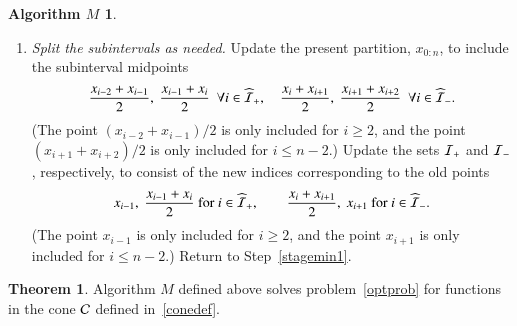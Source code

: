 \documentclass[review]{elsarticle}
\theoremstyle{definition}
\newtheorem*{algoM}{Algorithm $M$}
\newtheorem{theorem}{Theorem}
\begin{document}
\begin{algoM}
\begin{enumerate}[\em Step 1.]
		\item \label{stagemin2} \emph{Split the subintervals as needed.}
		Update the present partition, $x_{0:n}$, to include the subinterval midpoints
		\begin{equation*}
		\frac{x_{i-2} +x_{i-1}}{2}, \ \frac{x_{i-1} +x_{i}}{2} \ \ \forall i \in \widehat{\ci}_+, \quad 
		\frac{x_{i} +x_{i+1}}{2}, \  \frac{x_{i+1} +x_{i+2}}{2} \ \ \forall  i \in \widehat{\ci}_-.
		\end{equation*}
		(The point $(x_{i-2}+x_{i-1})/2$ is only included for $i \ge 2$, and the point 
		$(x_{i+1} +x_{i+2})/2$ is only included for $i \le n-2$.)  Update the sets  
		 $\mathcal{I}_{+}$ and $\mathcal{I}_-$, 
		respectively, to consist of the new indices corresponding to the old points 
		\[
		x_{i-1}, \ \frac{x_{i-1} +x_{i}}{2} \text{ for } i \in \widehat{\mathcal{I}}_+, \qquad  
		\frac{x_{i} +x_{i+1}}{2}, \  x_{i+1} \text{ for } i \in \widehat{\mathcal{I}}_-.
		\] 
		(The point $x_{i-1}$ is only included for $i \ge 2$, and the point $x_{i+1}$ is only 
		included for $i \le n-2$.) Return to Step~\ref{stagemin1}.
	\end{enumerate}
\end{algoM}

\begin{theorem} \label{thm:algMworks}
Algorithm $M$ defined above solves problem~\eqref{optprob} for functions in the
cone $\mathcal{C}$ defined in~\eqref{conedef}.
\end{theorem}
\end{document}
